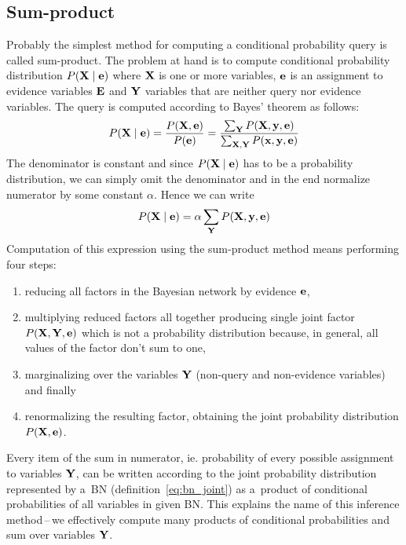 \documentclass[english,cover]{fitthesis} %
\newcommand{\vars}[1]{{\bold{#1}}}         %
\begin{document}
\subsection{Sum-product}
Probably the simplest method for computing a conditional probability query is called sum-product. The problem at hand is to compute conditional probability distribution $P(\vars{X} \mid \vars{e})$ where $\vars{X}$ is one or more variables, $\vars{e}$ is an assignment to evidence variables $\vars{E}$ and $\vars{Y}$ variables that are neither query nor evidence variables. The query is computed according to Bayes' theorem as follows:
\begin{equation*}
P(\vars{X} \mid \vars{e})
 = \frac{P(\vars{X}, \vars{e})} {P(\vars{e})}
 = \frac{\sum_\vars{Y} P(\vars{X}, \vars{y}, \vars{e})}{\sum_{\vars{X},\vars{Y}} P(\vars{x}, \vars{y}, \vars{e})}
\end{equation*}
The denominator is constant and since $P(\vars{X} \mid \vars{e})$ has to be a probability distribution, we can simply omit the denominator and in the end normalize numerator by some constant $\alpha$. Hence we can write
\begin{equation*}
P(\vars{X} \mid \vars{e})
 = \alpha \sum_\vars{Y} P(\vars{X}, \vars{y}, \vars{e})
\end{equation*}
Computation of this expression using the sum-product method means performing four steps:
\begin{enumerate}
	\item reducing all factors in the Bayesian network by evidence $\vars{e}$,
	\item multiplying reduced factors all together producing single joint factor $P(\vars{X},\vars{Y},\vars{e})$ which is not a probability distribution because, in general, all values of the factor don't sum to one,
	\item marginalizing over the variables $\vars{Y}$ (non-query and non-evidence variables) and finally
	\item renormalizing the resulting factor, obtaining the joint probability distribution $P(\vars{X},\vars{e})$.
\end{enumerate}

Every item of the sum in numerator, ie. probability of every possible assignment to variables $\vars{Y}$, can be written according to the joint probability distribution represented by a~BN (definition~\eqref{eq:bn_joint}) as a~product of conditional probabilities of all variables in given BN. This explains the name of this inference method\,--\,we effectively compute many products of conditional probabilities and sum over variables $\vars{Y}$.
\end{document}
